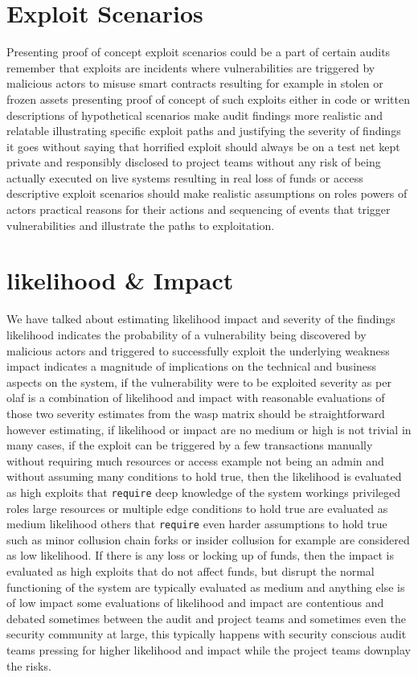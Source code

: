 \section{Exploit Scenarios}

Presenting proof of concept exploit scenarios could be a part of certain audits remember that exploits are incidents where vulnerabilities are triggered by malicious actors to misuse smart contracts resulting for example in stolen or frozen assets presenting proof of concept of such exploits either in code or written descriptions of hypothetical scenarios make audit findings more realistic and relatable illustrating specific exploit paths and justifying the severity of findings it goes without saying that horrified exploit should always be on a test net kept private and responsibly disclosed to project teams without any risk of being actually executed on live systems resulting in real loss of funds or access descriptive exploit scenarios should make realistic assumptions on roles powers of actors practical reasons for their actions and sequencing of events that trigger vulnerabilities and illustrate the paths to exploitation.

\section{likelihood \& Impact}

We have talked about estimating likelihood impact and severity of the findings likelihood indicates the probability of a vulnerability being discovered by malicious actors and triggered to successfully exploit the underlying weakness impact indicates a magnitude of implications on the technical and business aspects on the system, if the vulnerability were to be exploited severity as per olaf is a combination of likelihood and impact with reasonable evaluations of those two severity estimates from the wasp matrix should be straightforward however estimating, if likelihood or impact are no medium or high is not trivial in many cases, if the exploit can be triggered by a few transactions manually without requiring much resources or access example not being an admin and without assuming many conditions to hold true, then the likelihood is evaluated as high exploits that \verb|require| deep knowledge of the system workings privileged roles large resources or multiple edge conditions to hold true are evaluated as medium likelihood others that \verb|require| even harder assumptions to hold true such as minor collusion chain forks or insider collusion for example are considered as low likelihood. If there is any loss or locking up of funds, then the impact is evaluated as high exploits that do not affect funds, but disrupt the normal functioning of the system are typically evaluated as medium and anything else is of low impact some evaluations of likelihood and impact are contentious and debated sometimes between the audit and project teams and sometimes even the security community at large, this typically happens with security conscious audit teams pressing for higher likelihood and impact while the project teams downplay the risks.

